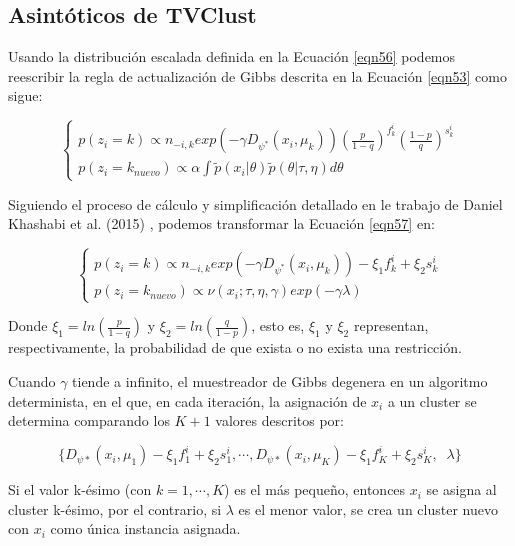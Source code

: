 \subsection{Asintóticos de TVClust}

Usando la distribución escalada definida en la Ecuación \ref{eqn56} podemos reescribir la regla de actualización de Gibbs descrita en la Ecuación \ref{eqn53} como sigue:

\begin{equation}
\begin{cases}
p(z_i = k) \varpropto n_{-i,k}exp(-\gamma D_{\psi^*}(x_i,\mu_k))\left(\frac{p}{1-q}\right)^{f_{k}^i} \left(\frac{1-p}{q}\right)^{s_{k}^i} \\
p(z_i = k_{nuevo}) \varpropto \alpha \int \widetilde{p}(x_i|\theta)\widetilde{p}(\theta|\tau, \eta)d\theta
\end{cases}
\label{eqn57}
\end{equation}

Siguiendo el proceso de cálculo y simplificación detallado en le trabajo de Daniel Khashabi et al. (2015) \cite{RDPM:2015}, podemos transformar la Ecuación \ref{eqn57} en:

\begin{equation}
\begin{cases}
p(z_i = k) \varpropto n_{-i,k}exp(-\gamma D_{\psi^*}(x_i,\mu_k)) - \xi_1 f_{k}^i + \xi_2 s_{k}^i \\
p(z_i = k_{nuevo}) \varpropto \nu(x_i; \tau, \eta, \gamma) exp(-\gamma \lambda)
\end{cases}
\label{eqn58}
\end{equation}

Donde $\xi_1 = ln\left(\frac{p}{1-q}\right)$ y $\xi_2 = ln\left(\frac{q}{1-p}\right)$, esto es, $\xi_1$ y $\xi_2$ representan, respectivamente, la probabilidad de que exista o no exista una restricción.

Cuando $\gamma$ tiende a infinito, el muestreador de Gibbs degenera en un algoritmo determinista, en el que, en cada iteración, la asignación de $x_i$ a un cluster se determina comparando los $K+1$ valores descritos por:

\begin{equation}
\{D_{\psi*}(x_i, \mu_1) - \xi_1 f_{1}^i  + \xi_2 s_{1}^i, \cdots, D_{\psi*}(x_i, \mu_K) - \xi_1 f_{K}^i + \xi_2 s_{K}^i, \;\; \lambda \}
\label{eqn59}
\end{equation}

Si el valor k-ésimo (con $k = 1, \cdots, K$) es el más pequeño, entonces $x_i$ se asigna al cluster k-ésimo, por el contrario, si $\lambda$ es el menor valor, se crea un cluster nuevo con $x_i$ como única instancia asignada.


